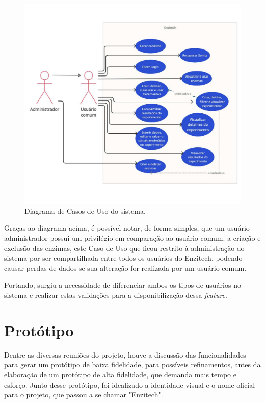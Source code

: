 \begin{figure}[H]
\centering
  \includegraphics[width=\columnwidth]{images/use-cases-enzitech.pdf}
  \caption{Diagrama de Casos de Uso do sistema.}
  \label{fig:use-cases-enzitech}
\end{figure}

Graças ao diagrama acima, é possível notar, de forma simples, que um usuário administrador possui um privilégio em comparação ao usuário comum: a criação e exclusão das enzimas, este Caso de Uso que ficou restrito à administração do sistema por ser compartilhada entre todos os usuários do Enzitech, podendo causar perdas de dados se sua alteração for realizada por um usuário comum.

Portando, surgiu a necessidade de diferenciar ambos os tipos de usuários no sistema e realizar estas validações para a disponibilização dessa \textit{feature}. 

\section{Protótipo}
Dentre as diversas reuniões do projeto, houve a discussão das funcionalidades para gerar um protótipo de baixa fidelidade, para possíveis refinamentos, antes da elaboração de um protótipo de alta fidelidade, que demanda mais tempo e esforço. Junto desse protótipo, foi idealizado a identidade visual e o nome oficial para o projeto, que passou a se chamar "Enzitech".

